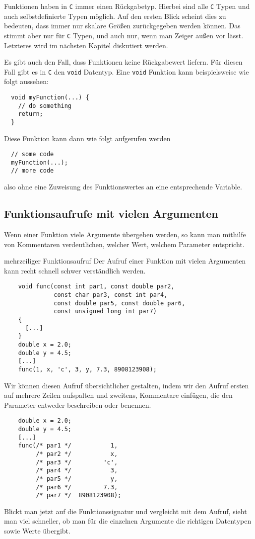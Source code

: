 Funktionen haben in \texttt{C} immer einen Rückgabetyp.
Hierbei sind alle \texttt{C} Typen und auch selbstdefinierte Typen möglich.
Auf den ersten Blick scheint dies zu bedeuten, dass immer nur skalare Größen zurückgegeben werden können.
Das stimmt aber nur für \texttt{C} Typen, und auch nur, wenn man Zeiger außen vor lässt.
Letzteres wird im nächsten Kapitel diskutiert werden.

Es gibt auch den Fall, dass Funktionen keine Rückgabewert liefern.
Für diesen Fall gibt es in \texttt{C} den \verb|void| Datentyp.
Eine \verb|void| Funktion kann beispielsweise wie folgt aussehen:
\begin{lstlisting}
  void myFunction(...) {
    // do something
    return;
  }
\end{lstlisting}
Diese Funktion kann dann wie folgt aufgerufen werden
\begin{lstlisting}
  // some code
  myFunction(...);
  // more code
\end{lstlisting}
also ohne eine Zuweisung des Funktionswertes an eine entsprechende Variable.

\subsection{Funktionsaufrufe mit vielen Argumenten}

Wenn einer Funktion viele Argumente übergeben werden, so kann man mithilfe von Kommentaren verdeutlichen, welcher Wert, welchem Parameter entspricht.

\begin{myalertblock}{mehrzeiliger Funktionsaufruf}
  Der Aufruf einer Funktion mit vielen Argumenten kann recht schnell schwer verständlich werden.
  \begin{lstlisting}
    void func(const int par1, const double par2, 
              const char par3, const int par4, 
              const double par5, const double par6,
              const unsigned long int par7)
    {
      [...]
    }
    double x = 2.0;
    double y = 4.5;
    [...]
    func(1, x, 'c', 3, y, 7.3, 8908123908);
  \end{lstlisting}
  Wir können diesen Aufruf übersichtlicher gestalten, indem wir den Aufruf ersten auf mehrere Zeilen aufspalten und zweitens, Kommentare einfügen, die den Parameter entweder beschreiben oder benennen.
  \begin{lstlisting}
    double x = 2.0;
    double y = 4.5;
    [...]
    func(/* par1 */           1,
         /* par2 */           x,
         /* par3 */         'c',
         /* par4 */           3,
         /* par5 */           y,
         /* par6 */         7.3,
         /* par7 */  8908123908);
  \end{lstlisting}
  Blickt man jetzt auf die Funktionssignatur und vergleicht mit dem Aufruf, sieht man viel schneller, ob man für die einzelnen Argumente die richtigen Datentypen sowie Werte übergibt.
\end{myalertblock}

\endinput
